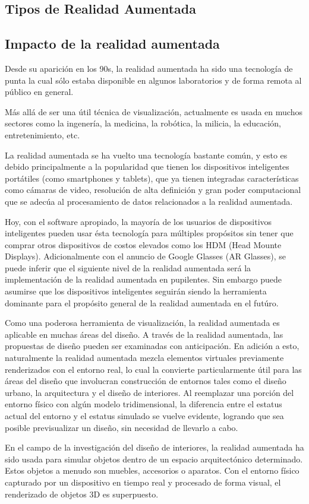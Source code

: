\subsection{Tipos de Realidad Aumentada}
\subsection{Impacto de la realidad aumentada}
Desde su aparición en los 90s, la realidad aumentada ha sido una tecnología de punta la cual sólo estaba disponible en algunos laboratorios y de forma remota al público en general. \par
Más allá de ser una útil técnica de visualización, actualmente es usada en muchos sectores como la ingenería, la medicina, la robótica, la milicia, la educación, entretenimiento, etc.\par
La realidad aumentada se ha vuelto una tecnología bastante común, y esto es debido principalmente a la popularidad que tienen los dispositivos inteligentes portátiles (como smartphones y tablets), que ya tienen integradas características como cámaras de video, resolución de alta definición y gran poder computacional que se adecúa al procesamiento de datos relacionados a la realidad aumentada.\par
Hoy, con el software apropiado, la mayoría de los usuarios de dispositivos inteligentes pueden usar ésta tecnología para múltiples propósitos sin tener que comprar otros dispositivos de costos elevados como los HDM (Head Mounte Displays). Adicionalmente con el anuncio de Google Glasses (AR Glasses), se puede inferir que el siguiente nivel de la realidad aumentada será la implementación de la realidad aumentada en pupilentes. Sin embargo puede asumirse que los dispositivos inteligentes seguirán siendo la herramienta dominante para el propósito general de la realidad aumentada en el futúro.\par
Como una poderosa herramienta de visualización, la realidad aumentada es aplicable en muchas áreas del diseño. A través de la realidad aumentada, las propuestas de diseño pueden ser examinadas con anticipación. En adición a esto, naturalmente la realidad aumentada mezcla elementos virtuales previamente renderizados con el entorno real, lo cual la convierte particularmente útil para las áreas del diseño que involucran construcción de entornos tales como el diseño urbano, la arquitectura y el diseño de interiores. Al reemplazar una porción del entorno físico con algún modelo tridimensional, la diferencia entre el estatus actual del entorno y el estatus simulado se vuelve evidente, logrando que sea posible previsualizar un diseño, sin necesidad de llevarlo a cabo.\par
En el campo de la investigación del diseño de interiores, la realidad aumentada ha sido usada para simular objetos dentro de un espacio arquitectónico determinado. Estos objetos a menudo son muebles, accesorios o aparatos. Con el entorno físico capturado por un dispositivo en tiempo real y procesado de forma visual, el renderizado de objetos 3D es superpuesto.\cite{B15}


